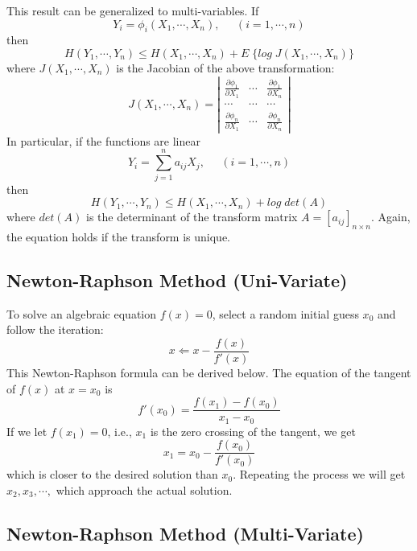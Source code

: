 \documentclass[12pt, a4paper, onecolumn]{IEEEtran}
\begin{document}
This result can be generalized to multi-variables. If
\[	Y_i=\phi_i(X_1,\cdots,X_n),\;\;\;\;\;(i=1,\cdots,n) \]
then
\[ H(Y_1,\cdots,Y_n) \le H(X_1,\cdots,X_n)+E\;\{ log\;J(X_1,\cdots,X_n)\} \]
where $J(X_1,\cdots,X_n)$ is the Jacobian of the above transformation:
\[	J(X_1,\cdots,X_n)=\left| \begin{array}{ccc}
\frac{\partial \phi_1}{\partial X_1} & \cdots &\frac{\partial \phi_1}{\partial X_n} \\
\cdots & \cdots & \cdots \\
\frac{\partial \phi_n}{\partial X_1} & \cdots &\frac{\partial \phi_n}{\partial X_n}
\end{array} \right| \]
In particular, if the functions are linear
\[	Y_i=\sum_{j=1}^n a_{ij} X_j,\;\;\;\;\;(i=1,\cdots,n) \]
then
\[ H(Y_1,\cdots,Y_n) \le H(X_1,\cdots,X_n)+log\;det(A)	\]
where $det(A)$ is the determinant of the transform matrix
$A=[a_{ij}]_{n\times n}$. Again, the equation holds if the transform is unique.


\subsection*{Newton-Raphson Method (Uni-Variate)}

To solve an algebraic equation $f(x)=0$, select a random initial guess $x_0$
and follow the iteration:
\[	x \Leftarrow x-\frac{f(x)}{f'(x)}	\]
This Newton-Raphson formula can be derived below. The equation of the tangent
of $f(x)$ at $x=x_0$ is
\[	f'(x_0) = \frac{f(x_1)-f(x_0)}{x_1-x_0}	\]
If we let $f(x_1)=0$, i.e., $x_1$ is the zero crossing of the tangent, we get
\[	x_1=x_0-\frac{f(x_0)}{f'(x_0)}	\]
which is closer to the desired solution than $x_0$. Repeating the process we
will get $x_2, x_3, \cdots, $ which approach the actual solution.

\subsection*{Newton-Raphson Method (Multi-Variate)}
\end{document}
